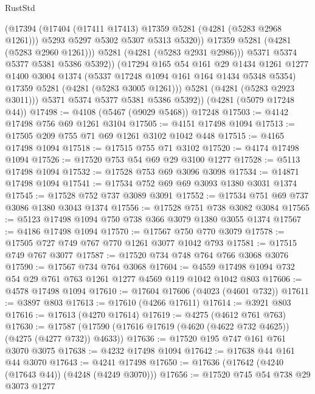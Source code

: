 \begin{lexlean}{RustStd}
\begin{coremodule}
                    (@17394
                      (@17404 (@17411 @17413) @17359 @5281 (@4281 (@5283 @2968 @1261)))
                      @5293
                      @5297
                      @5302
                      @5307
                      @5313
                      @5320))
                  @17359
                  @5281
                  (@4281 (@5283 @2960 @1261)))
                @5281
                (@4281 (@5283 @2931 @2986)))
              @5371
              @5374
              @5377
              @5381
              @5386
              @5392))
          (@17294
            @165
            @54
            @161
            @29
            @1434
            @1261
            @1277
            @1400
            @3004
            @1374
            (@5337 @17248 @1094 @161 @164 @1434 @5348 @5354)
            @17359
            @5281
            (@4281 (@5283 @3005 @1261)))
          @5281
          (@4281 (@5283 @2923 @3011)))
        @5371
        @5374
        @5377
        @5381
        @5386
        @5392))
    (@4281 (@5079 @17248 @44))
@17498 := @4108 (@5467 (@9029 @5468)) @17248
@17503 := @4142 @17498 @756 @69 @1261 @3104
@17505 := @4151 @17498 @1094
@17513 := @17505 @209 @755 @71 @69 @1261 @3102 @1042 @448
@17515 := @4165 @17498 @1094
@17518 := @17515 @755 @71 @3102
@17520 := @4174 @17498 @1094
@17526 := @17520 @753 @54 @69 @29 @3100 @1277
@17528 := @5113 @17498 @1094
@17532 := @17528 @753 @69 @3096 @3098
@17534 := @14871 @17498 @1094
@17541 := @17534 @752 @69 @69 @3093 @1380 @3031 @1374
@17545 := @17528 @752 @737 @3089 @3091
@17552 := @17534 @751 @69 @737 @3086 @1380 @3043 @1374
@17556 := @17528 @751 @738 @3082 @3084
@17565 := @5123 @17498 @1094 @750 @738 @366 @3079 @1380 @3055 @1374
@17567 := @4186 @17498 @1094
@17570 := @17567 @750 @770 @3079
@17578 := @17505 @727 @749 @767 @770 @1261 @3077 @1042 @793
@17581 := @17515 @749 @767 @3077
@17587 := @17520 @734 @748 @764 @766 @3068 @3076
@17590 := @17567 @734 @764 @3068
@17604 := @4559 @17498 @1094 @732 @54 @29 @761 @763 @1261 @1277 @4569 @119 @1042 @1042 @803
@17606 := @4578 @17498 @1094
@17610 := @17604 @17606 (@4023 (@4601 @732))
@17611 := @3897 @803
@17613 := @17610 (@4266 @17611)
@17614 := @3921 @803
@17616 := @17613 (@4270 @17614)
@17619 := @4275 (@4612 @761 @763)
@17630 := @17587 (@17590 (@17616 @17619 (@4620 (@4622 @732 @4625)) (@4275 (@4277 @732)) @4633))
@17636 := @17520 @195 @747 @161 @761 @3070 @3075
@17638 := @4232 @17498 @1094
@17642 := @17638 @44 @161 @44 @3070
@17643 := @4241 @17498
@17650 := @17636 (@17642 (@4240 (@17643 @44)) (@4248 (@4249 @3070)))
@17656 := @17520 @745 @54 @738 @29 @3073 @1277

\end{coremodule}
\end{lexlean}
